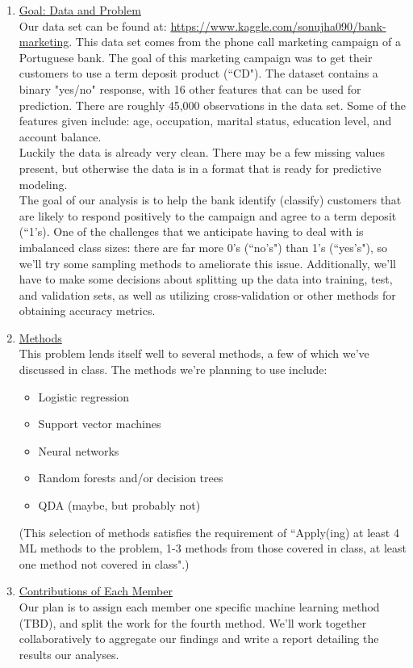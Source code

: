 \documentclass[12pt,letterpaper,final]{article}
\begin{document}
\begin{enumerate}


\item \uline{Goal: Data and Problem}\\
Our data set can be found at: \url{https://www.kaggle.com/sonujha090/bank-marketing}. This data set comes from the phone call marketing campaign of a Portuguese bank. The goal of this marketing campaign was to get their customers to use a term deposit product (``CD"). The dataset contains a binary "yes/no" response, with 16 other features that can be used for prediction. There are roughly 45,000 observations in the data set. Some of the features given include: age, occupation, marital status, education level, and account balance.\\
Luckily the data is already very clean. There may be a few missing values present, but otherwise the data is in a format that is ready for predictive modeling.\\
The goal of our analysis is to help the bank identify (classify) customers that are likely to respond positively to the campaign and agree to a term deposit (``1's). One of the challenges that we anticipate having to deal with is imbalanced class sizes: there are far more 0's (``no's") than 1's (``yes's"), so we'll try some sampling methods to ameliorate this issue. Additionally, we'll have to make some decisions about splitting up the data into training, test, and validation sets, as well as utilizing cross-validation or other methods for obtaining accuracy metrics.


\item \uline{Methods}\\
This problem lends itself well to several methods, a few of which we've discussed in class. The methods we're planning to use include:
\begin{itemize}
  \item Logistic regression
  \item Support vector machines
  \item Neural networks
  \item Random forests and/or decision trees
  \item QDA (maybe, but probably not)
\end{itemize}
(This selection of methods satisfies the requirement of ``Apply(ing) at least 4 ML methods to the problem, 1-3 methods from those covered in class, at least one method not covered in class".)

\item \uline{Contributions of Each Member}\\
Our plan is to assign each member one specific machine learning method (TBD), and split the work for the fourth method. We'll work together collaboratively to aggregate our findings and write a report detailing the results our analyses.





\end{enumerate}
\end{document}
